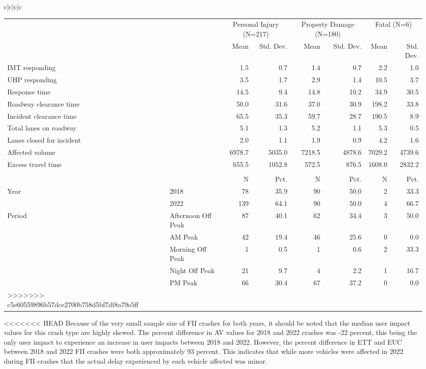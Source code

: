 \documentclass[
  letterpaper,
  authoryear]{elsarticle}
\begin{document}
\begin{table}
{\begin{tabular}[t]{c|c|c|c}
\begin{table}
{\centering\centering
\begin{tabular}[t]{llrrrrrr}
\toprule
\multicolumn{2}{c}{ } & \multicolumn{2}{c}{Personal Injury (N=217)} & \multicolumn{2}{c}{Property Damage (N=180)} & \multicolumn{2}{c}{Fatal (N=6)} \\
\cmidrule(l{3pt}r{3pt}){3-4} \cmidrule(l{3pt}r{3pt}){5-6} \cmidrule(l{3pt}r{3pt}){7-8}
  &    & Mean & Std. Dev. & Mean & Std. Dev. & Mean & Std. Dev.\\
\midrule
IMT responding &  & 1.5 & 0.7 & 1.4 & 0.7 & 2.2 & 1.0\\
UHP responding &  & 3.5 & 1.7 & 2.9 & 1.4 & 10.5 & 3.7\\
Response time &  & 14.5 & 9.4 & 14.8 & 10.2 & 34.9 & 30.5\\
Roadway clearance time &  & 50.0 & 31.6 & 37.0 & 30.9 & 198.2 & 33.8\\
Incident clearance time &  & 65.5 & 35.3 & 59.7 & 28.7 & 190.5 & 8.9\\
Total lanes on roadway &  & 5.1 & 1.3 & 5.2 & 1.1 & 5.3 & 0.5\\
Lanes closed for incident &  & 2.0 & 1.1 & 1.9 & 0.9 & 4.2 & 1.6\\
Affected volume &  & 6978.7 & 5035.0 & 7218.5 & 4878.6 & 7029.2 & 4739.6\\
Excess travel time &  & 655.5 & 1052.8 & 572.5 & 876.5 & 1608.0 & 2832.2\\
\midrule\\
 &  & N & Pct. & N & Pct. & N & Pct.\\
Year & 2018 & 78 & 35.9 & 90 & 50.0 & 2 & 33.3\\
 & 2022 & 139 & 64.1 & 90 & 50.0 & 4 & 66.7\\
Period & Afternoon Off Peak & 87 & 40.1 & 62 & 34.4 & 3 & 50.0\\
 & AM Peak & 42 & 19.4 & 46 & 25.6 & 0 & 0.0\\
 & Morning Off Peak & 1 & 0.5 & 1 & 0.6 & 2 & 33.3\\
 & Night Off Peak & 21 & 9.7 & 4 & 2.2 & 1 & 16.7\\
 & PM Peak & 66 & 30.4 & 67 & 37.2 & 0 & 0.0\\
\bottomrule
>>>>>>> c5e60559896b57dce2700b758d5bf7df8a79e5ff
\end{tabular}

}

\end{table}%

<<<<<<< HEAD
Because of the very small sample size of FII crashes for both years, it
should be noted that the median user impact values for this crash type
are highly skewed. The percent difference in AV values for 2018 and 2022
crashes was -22 percent, this being the only user impact to experience
an increase in user impacts between 2018 and 2022. However, the percent
difference in ETT and EUC between 2018 and 2022 FII crashes were both
approximately 93 percent. This indicates that while more vehicles were
affected in 2022 during FII crashes that the actual delay experienced by
each vehicle affected was minor.


\end{tabular}}
\end{table}
\end{document}
